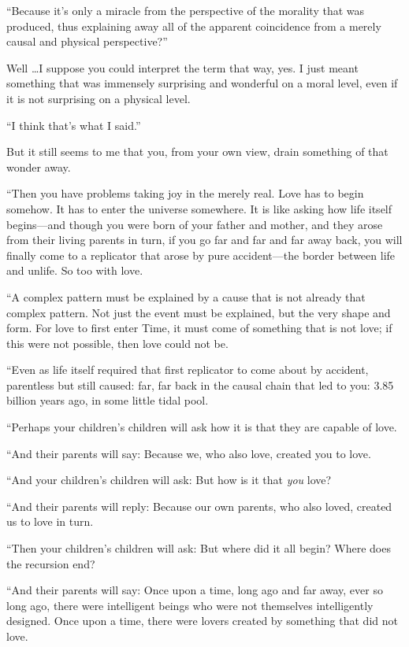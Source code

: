 {
 ``Because it's only a miracle
from the perspective of the morality that was produced, thus explaining
away all of the apparent coincidence from a merely causal and physical
perspective?''}

{
 Well \ldots I suppose you could interpret the term that way, yes. I
just meant something that was immensely surprising and wonderful on a
moral level, even if it is not surprising on a physical level.}

{
 ``I think that's what I
said.''}

{
 But it still seems to me that you, from your own view, drain
something of that wonder away.}

{
 ``Then you have problems taking joy in the merely
real. Love has to begin somehow. It has to enter the universe
somewhere. It is like asking how life itself begins---and though you
were born of your father and mother, and they arose from their living
parents in turn, if you go far and far and far away back, you will
finally come to a replicator that arose by pure accident---the border
between life and unlife. So too with love.}

{
 ``A complex pattern must be explained by a cause
that is not already that complex pattern. Not just the event must be
explained, but the very shape and form. For love to first enter Time,
it must come of something that is not love; if this were not possible,
then love could not be.}

{
 ``Even as life itself required that first
replicator to come about by accident, parentless but still caused: far,
far back in the causal chain that led to you: 3.85 billion years ago,
in some little tidal pool.}

{
 ``Perhaps your children's
children will ask how it is that they are capable of love.}

{
 ``And their parents will say: Because we, who
also love, created you to love.}

{
 ``And your children's children
will ask: But how is it that \textit{you} love?}

{
 ``And their parents will reply: Because our own
parents, who also loved, created us to love in turn.}

{
 ``Then your children's children
will ask: But where did it all begin? Where does the recursion end?}

{
 ``And their parents will say: Once upon a time,
long ago and far away, ever so long ago, there were intelligent beings
who were not themselves intelligently designed. Once upon a time, there
were lovers created by something that did not love.}

